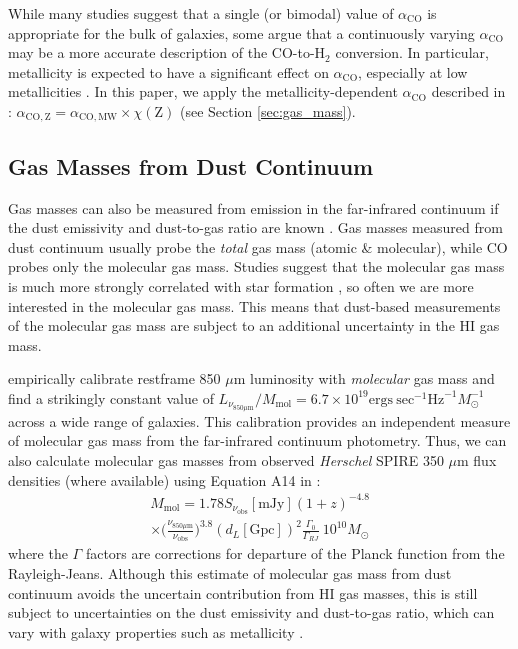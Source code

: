 \documentclass[a4paper,fleqn,usenatbib]{mnras}
\newcommand{\aco}{\alpha_{\mathrm{CO}}}
\begin{document}
While many studies suggest that a single (or bimodal) value of $\aco$ is appropriate for the bulk of galaxies, some argue that a continuously varying $\aco$ may be a more accurate description of the CO-to-H$_{2}$ conversion. In particular, metallicity is expected to have a significant effect on $\aco$, especially at low metallicities \citep[e.g.][]{2011ApJ...737...12L,2012ApJ...746...69G,2013ARA&A..51..207B}. In this paper, we apply the metallicity-dependent $\aco$ described in \citet{2015ApJ...800...20G}: $\alpha_{\mathrm{CO, Z}} = \alpha_{\mathrm{CO, MW}} \times \chi(\mathrm{Z})$ (see Section \ref{sec:gas_mass}). 

\subsection{Gas Masses from Dust Continuum}\label{sec:gas_dust}

Gas masses can also be measured from emission in the far-infrared continuum if the dust emissivity and dust-to-gas ratio are known \citep[e.g.][]{2011ApJ...740L..15M,2011A&A...536A..19P}. Gas masses measured from dust continuum usually probe the {\em total} gas mass (atomic \& molecular), while CO probes only the molecular gas mass. Studies suggest that the molecular gas mass is much more strongly correlated with star formation \citep[see review in][]{2012ARA&A..50..531K}, so often we are more interested in the molecular gas mass. This means that dust-based measurements of the molecular gas mass are subject to an additional uncertainty in the HI gas mass. 

\citet{2014ApJ...783...84S,2016ApJ...820...83S} empirically calibrate restframe 850 $\mu$m luminosity with {\em molecular} gas mass and find a strikingly constant value of $L_{\nu_{850 \mu{\mathrm m}}} / M_{\mathrm{mol}} = 6.7 \times 10^{19} \mathrm{ergs\ sec}^{-1} \mathrm{Hz}^{-1} M_{\odot}^{-1}$ across a wide range of galaxies. This calibration provides an independent measure of molecular gas mass from the far-infrared continuum photometry. Thus, we can also calculate molecular gas masses from observed {\em Herschel} SPIRE 350 $\mu$m flux densities (where available) using Equation A14 in \citet{2016ApJ...820...83S}: 
\begin{multline*}
M_{\mathrm{mol}} = 1.78 S_{\nu_{\mathrm{obs}}} [\mathrm{mJy}] (1+z)^{-4.8} \\
\times \big(\frac{\nu_{850 \mu\mathrm{m}}}{\nu_{\mathrm{obs}}}\big)^{3.8} (d_{L} [\mathrm{Gpc}])^{2} \frac{\Gamma_{0}}{\Gamma_{RJ}}\ 10^{10} M_{\odot}
\end{multline*}
 where the $\Gamma$ factors are corrections for departure of the Planck function from the Rayleigh-Jeans. Although this estimate of molecular gas mass from dust continuum avoids the uncertain contribution from HI gas masses, this is still subject to uncertainties on the dust emissivity and dust-to-gas ratio, which can vary with galaxy properties such as metallicity \citep[e.g.][]{2007ApJ...663..866D,2014A&A...563A..31R}.
\end{document}
